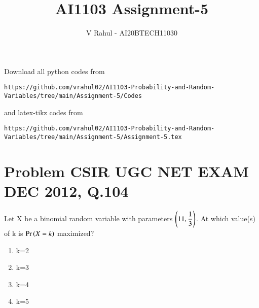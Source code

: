 \documentclass[journal,12pt,twocolumn]{IEEEtran}
\begin{document}
\title{AI1103 Assignment-5}
\author{V Rahul - AI20BTECH11030}
\maketitle
\newpage
\bigskip
\renewcommand{\thefigure}{\theenumi}
\renewcommand{\thetable}{\theenumi}
Download all python codes from 
\begin{lstlisting}
https://github.com/vrahul02/AI1103-Probability-and-Random-Variables/tree/main/Assignment-5/Codes
\end{lstlisting}
%
and latex-tikz codes from 
%
\begin{lstlisting}
https://github.com/vrahul02/AI1103-Probability-and-Random-Variables/tree/main/Assignment-5/Assignment-5.tex
\end{lstlisting}
\section*{Problem CSIR UGC NET EXAM DEC 2012, Q.104}
Let X be a binomial random variable with parameters  $\left(11,\displaystyle{\frac{1}{3}}\right)$. At which value(s) of k is $\Pr\left(X = k\right)$ maximized?
\newline
\begin{enumerate}
\item k=2
\item k=3
\item k=4
\item k=5
\end{enumerate}
\end{document}
